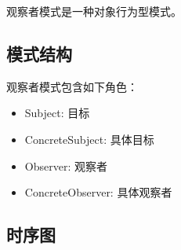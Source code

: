 \documentclass[letterpaper,10pt,english]{sphinxmanual}
\begin{document}
\sphinxAtStartPar
观察者模式是一种对象行为型模式。


\subsection{模式结构}
\label{\detokenize{behavioral_patterns/observer:id5}}
\sphinxAtStartPar
观察者模式包含如下角色：
\begin{itemize}
\item {} 
\sphinxAtStartPar
Subject: 目标

\item {} 
\sphinxAtStartPar
ConcreteSubject: 具体目标

\item {} 
\sphinxAtStartPar
Observer: 观察者

\item {} 
\sphinxAtStartPar
ConcreteObserver: 具体观察者

\end{itemize}

\noindent{}


\subsection{时序图}
\label{\detokenize{behavioral_patterns/observer:id6}}
\noindent{}
\end{document}
